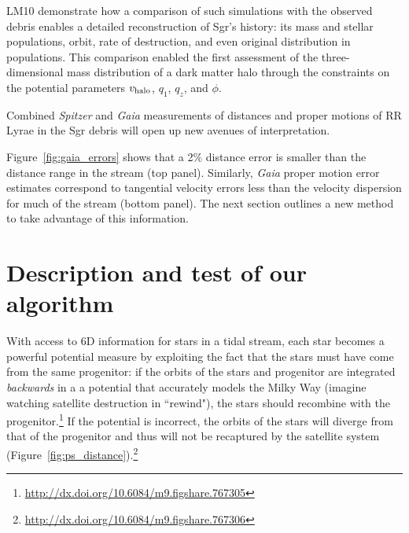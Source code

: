 \documentclass{emulateapj}
\begin{document}
LM10 demonstrate how a comparison of such simulations with the
observed debris enables a detailed reconstruction of Sgr's history:
its mass and stellar populations, orbit, rate of destruction, and even
original distribution in populations. 
This comparison enabled the first 
assessment of the three-dimensional mass distribution of a dark matter
halo through the constraints on the potential parameters $v_{\rm halo}$, $q_1$, $q_z$, and $\phi$.

Combined {\it Spitzer} and {\it Gaia} measurements of distances and proper motions
of RR Lyrae in the Sgr debris will open up new avenues of
interpretation. 

Figure~\ref{fig:gaia_errors} shows that a 2\% distance error is smaller than the 
distance range in the stream (top panel). Similarly, {\it Gaia} proper motion
error estimates correspond to tangential velocity errors less than the velocity
dispersion for much of the stream (bottom panel). The next section outlines a 
new method to take advantage of this information. 


\section{Description and test of our algorithm}
\label{sec:method}
With access to 6D information for stars in a tidal
stream, each star becomes a powerful potential
measure by exploiting the fact that the stars must have come from the
same progenitor: if the orbits of the stars and progenitor are integrated 
\emph{backwards} in a a potential that accurately models the Milky Way
(imagine watching satellite destruction in ``rewind"), the stars
should recombine with the progenitor.\footnote{\url{http://dx.doi.org/10.6084/m9.figshare.767305}} If the potential is incorrect,
the orbits of the stars will diverge from that of the progenitor and
thus will not be recaptured by the satellite system (Figure~\ref{fig:ps_distance}).\footnote{\url{http://dx.doi.org/10.6084/m9.figshare.767306}}
\end{document}
